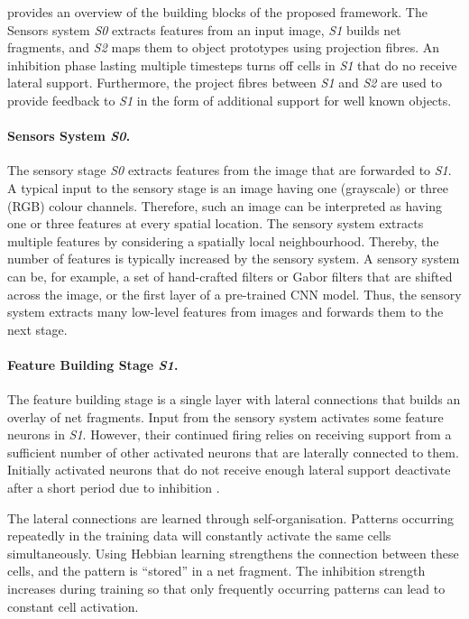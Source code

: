  provides an overview of the building blocks of the proposed framework. The Sensors system \emph{S0} extracts features from an input image, \emph{S1} builds net fragments, and \emph{S2} maps them to object prototypes using projection fibres. An inhibition phase lasting multiple timesteps turns off cells in \emph{S1} that do no receive lateral support. Furthermore, the project fibres between \emph{S1} and \emph{S2} are used to provide feedback to \emph{S1} in the form of additional support for well known objects.

\paragraph{Sensors System \emph{S0}.} The sensory stage \emph{S0} extracts features from the image that are forwarded to \emph{S1}.
A typical input to the sensory stage is an image having one (grayscale) or three (RGB) colour channels. Therefore, such an image can be interpreted as having one or three features at every spatial location.
The sensory system extracts multiple features by considering a spatially local neighbourhood. Thereby, the number of features is typically increased by the sensory system.
A sensory system can be, for example, a set of hand-crafted filters or Gabor filters that are shifted across the image, or the first layer of a pre-trained CNN model.
Thus, the sensory system extracts many low-level features from images and forwards them to the next stage.

\paragraph{Feature Building Stage \emph{S1}.} The feature building stage is a single layer with lateral connections  that builds an overlay of net fragments. Input from the sensory system activates some feature neurons in \emph{S1}. However, their continued firing relies on receiving support from a sufficient number of other activated neurons that are laterally connected to them. Initially activated neurons that do not receive enough lateral support deactivate after a short period due to inhibition .

The lateral connections are learned through self-organisation. Patterns occurring repeatedly in the training data will constantly activate the same cells simultaneously. Using Hebbian learning strengthens the connection between these cells, and the pattern is ``stored'' in a net fragment. The inhibition strength increases during training so that only frequently occurring patterns can lead to constant cell activation.

